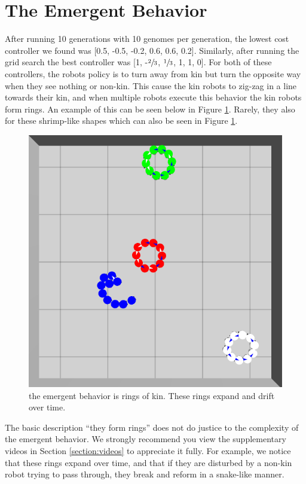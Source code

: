\documentclass[conference]{IEEEtran}
\begin{document}
\section{The Emergent Behavior}

    After running 10 generations with 10 genomes per generation, the lowest cost controller we found was [0.5, -0.5, -0.2, 0.6, 0.6, 0.2]. Similarly, after running the grid search the best controller was [1, -$\sfrac{2}{3}$, $\sfrac{1}{3}$, 1, 1, 0]. For both of these controllers, the robots policy is to turn away from kin but turn the opposite way when they see nothing or non-kin. This cause the kin robots to zig-zag in a line towards their kin, and when multiple robots execute this behavior the kin robots form rings. An example of this can be seen below in Figure \ref{fig:rings}. Rarely, they also for these shrimp-like shapes which can also be seen in Figure \ref{fig:rings}.

    \begin{figure}
      \centering
      \includegraphics[width=0.7\linewidth]{./images/rings_example.png}
      \caption{the emergent behavior is rings of kin. These rings expand and drift over time.}
      \label{fig:rings}
    \end{figure}

    The basic description ``they form rings'' does not do justice to the complexity of the emergent behavior. We strongly recommend you view the supplementary videos in Section \ref{section:videos} to appreciate it fully. For example, we notice that these rings expand over time, and that if they are disturbed by a non-kin robot trying to pass through, they break and reform in a snake-like manner.
\end{document}

